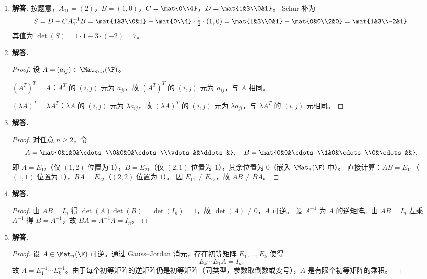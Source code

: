 \begin{enumerate}[label=\textbf{\arabic*.}, leftmargin=*, itemsep=1em]
  \item \textbf{解答.}
  按题意，$A_{11}=(2)$，$B=(1,0)$，$C=\mat{0\\4}$，$D=\mat{1&3\\0&1}$。
  Schur 补为
  \[
    S = D - C A_{11}^{-1} B
      = \mat{1&3\\0&1} - \mat{0\\4}\cdot\tfrac{1}{2}\cdot(1,0)
      = \mat{1&3\\0&1} - \mat{0&0\\2&0}
      = \mat{1&3\\-2&1}.
  \]
  其值为 $\det(S)=1\cdot1-3\cdot(-2)=7$。


  \item \textbf{解答.}
  \begin{proof}
  设 $A=(a_{ij})\in\Mat_{m,n}(\F)$。
  
  \emph{$(A^T)^T=A$}：$A^T$ 的 $(i,j)$ 元为 $a_{ji}$，故 $(A^T)^T$ 的 $(i,j)$ 元为 $a_{ij}$，与 $A$ 相同。
  
  \emph{$(\lambda A)^T=\lambda A^T$}：$\lambda A$ 的 $(i,j)$ 元为 $\lambda a_{ij}$，故 $(\lambda A)^T$ 的 $(i,j)$ 元为 $\lambda a_{ji}$，与 $\lambda A^T$ 的 $(i,j)$ 元相同。
  \end{proof}

  \item \textbf{解答.}
  \begin{proof}
  对任意 $n\ge2$，令
  \[
    A=\mat{0&1&0&\cdots\\0&0&0&\cdots\\\vdots&&\ddots&},\quad
    B=\mat{0&0&\cdots\\1&0&\cdots\\0&\cdots&&},
  \]
  即 $A=E_{12}$（仅 $(1,2)$ 位置为 $1$），$B=E_{21}$（仅 $(2,1)$ 位置为 $1$），其余位置为 $0$（嵌入 $\Mat_n(\F)$ 中）。
  直接计算：$AB=E_{11}$（$(1,1)$ 位置为 $1$），$BA=E_{22}$（$(2,2)$ 位置为 $1$）。
  因 $E_{11}\ne E_{22}$，故 $AB\ne BA$。
  \end{proof}

  \item \textbf{解答.}
  \begin{proof}
  由 $AB=I_n$ 得 $\det(A)\det(B)=\det(I_n)=1$，故 $\det(A)\ne0$，$A$ 可逆。
  设 $A^{-1}$ 为 $A$ 的逆矩阵。由 $AB=I_n$ 左乘 $A^{-1}$ 得 $B=A^{-1}$，故 $BA=A^{-1}A=I_n$。
  \end{proof}

  \item \textbf{解答.}
  \begin{proof}
  设 $A\in\Mat_n(\F)$ 可逆。通过 Gauss–Jordan 消元，存在初等矩阵 $E_1,\dots,E_k$ 使得
  \[
    E_k\cdots E_1 A = I_n.
  \]
  故 $A = E_1^{-1}\cdots E_k^{-1}$。由于每个初等矩阵的逆矩阵仍是初等矩阵（同类型，参数取倒数或变号），$A$ 是有限个初等矩阵的乘积。
  \end{proof}


\end{enumerate}
